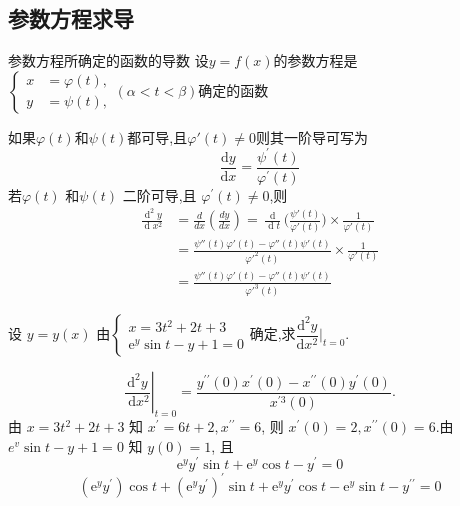 \documentclass[8pt a4paper, oneside, UTF8]{ctexbook}  %
\begin{document}
\begin{sloppypar}
    \subsection{参数方程求导}
    \begin{defn}{参数方程所确定的函数的导数}{}
        设$y=f(x)$的参数方程是$\left\{\begin{aligned}x&=\varphi(t),\\y&=\psi (t),\end{aligned}\right.(\alpha<t<\beta)$确定的函数

        如果$\varphi(t)$和$\psi(t)$都可导,且$\varphi'(t) \neq 0$则其一阶导可写为
        $$
            \dfrac{\mathrm{d}y}{\mathrm{d}x}=\frac{\psi^{\prime}(t)}{\varphi^{\prime}(t)}
        $$
        若$\varphi(t)$ 和$\psi(t)$ 二阶可导,且 $\varphi^{\prime}(t)\neq 0$,则
        $$
            \begin{aligned}
                \frac{\operatorname{d}^2y}{\operatorname{d}x^2} & =\frac{d}{dx}(\frac{dy}{dx}) =\frac{\operatorname{d}}{\operatorname{d}t}\Big(\frac{\psi'(t)}{\varphi'(t)}\Big) \times \frac{1}{\varphi'(t)} \\
                                                                & =\frac{\psi''(t)\varphi'(t)-\varphi''(t)\psi'(t)}{\varphi'^2(t)}\times \frac{1}{\varphi'(t)}                                                \\
                                                                & =\frac{\psi''(t)\varphi'(t)-\varphi''(t)\psi'(t)}{\varphi'^3(t)}
            \end{aligned}
        $$
    \end{defn}
    \begin{problem}
    设 $y=y(x)$ 由$\begin{cases}x=3t^2+2t+3\\\mathrm{e}^y\sin t-y+1=0\end{cases}$确定,求$\dfrac{\mathrm{d}^2y}{\mathrm{d}x^2}\Bigg\vert_{t=0}.$
    \end{problem}
    \begin{solution}
        $$\left.\frac{\mathrm{d}^2 y}{\mathrm{~d} x^2}\right|_{t=0}=\frac{y^{\prime \prime}(0) x^{\prime}(0)-x^{\prime \prime}(0) y^{\prime}(0)}{x^{\prime 3}(0)}.$$
        由 $x=3 t^2+2 t+3$ 知 $x^{\prime}=6 t+2, x^{\prime \prime}=6$, 则 $x^{\prime}(0)=2, x^{\prime \prime}(0)=6$.由 $e^v \sin t-y+1=0$ 知 $y(0)=1$, 且
        $$
            \mathrm{e}^y y^{\prime} \sin t+\mathrm{e}^y \cos t-y^{\prime}=0
        $$
        $$
            \left(\mathrm{e}^y y^{\prime}\right) \cos t+\left(\mathrm{e}^y y^{\prime}\right)^{\prime} \sin t+\mathrm{e}^y y^{\prime} \cos t-\mathrm{e}^y \sin t-y^{\prime \prime}=0
$$
\end{solution}
\end{sloppypar}
\end{document}
